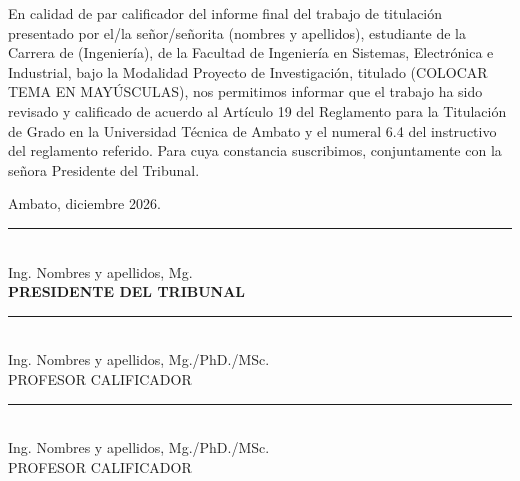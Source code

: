 
En calidad de par calificador del informe final del trabajo de titulación presentado por
el/la señor/señorita (nombres y apellidos), estudiante de la Carrera de (Ingeniería), de
la Facultad de Ingeniería en Sistemas, Electrónica e Industrial, bajo la Modalidad
Proyecto de Investigación, titulado (COLOCAR TEMA EN MAYÚSCULAS), nos permitimos
informar que el trabajo ha sido revisado y calificado de acuerdo al Artículo 19 del
Reglamento para la Titulación de Grado en la Universidad Técnica de Ambato y el numeral
6.4 del instructivo del reglamento referido. Para cuya constancia suscribimos,
conjuntamente con la señora Presidente del Tribunal.

\vspace{2em}
\begin{flushright}
    Ambato, diciembre 2026.
\end{flushright}

\vspace{4em}    
\begin{center}
    \rule{6cm}{0.4pt}\\[0.2cm]
    Ing. Nombres y apellidos, Mg.\\
    \textbf{PRESIDENTE DEL TRIBUNAL}
\end{center}


\vspace{3em}
\noindent
\begin{minipage}[t]{0.45\textwidth}
    \rule{6cm}{0.4pt}\\
    Ing. Nombres y apellidos, Mg./PhD./MSc.\\
    PROFESOR CALIFICADOR
\end{minipage}
\hfill
\begin{minipage}[t]{0.45\textwidth}
    \rule{6cm}{0.4pt}\\
    Ing. Nombres y apellidos, Mg./PhD./MSc.\\
    PROFESOR CALIFICADOR
\end{minipage}

